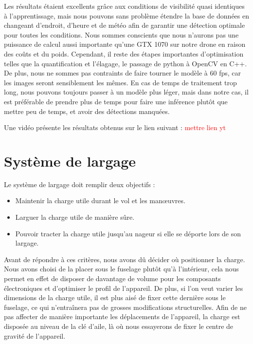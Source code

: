 \documentclass[a4paper,12pt,french]{report}
\begin{document}
Les résultats étaient excellents grâce aux conditions de visibilité quasi identiques à l'apprentissage, mais nous pouvons sans problème étendre la base de données en changeant d'endroit, d'heure et de météo afin de garantir une détection optimale pour toutes les conditions. Nous sommes conscients que nous n'aurons pas une puissance de calcul aussi importante qu'une GTX 1070 sur notre drone en raison des coûts et du poids. Cependant, il reste des étapes importantes d'optimisation telles que la quantification et l'élagage, le passage de python à OpenCV en C++. De plus, nous ne sommes pas contraints de faire tourner le modèle à 60 fps, car les images seront sensiblement les mêmes. En cas de temps de traitement trop long, nous pouvons toujours passer à un modèle plus léger, mais dans notre cas, il est préférable de prendre plus de temps pour faire une inférence plutôt que mettre peu de temps, et avoir des détections manquées.\newline

Une vidéo présente les résultats obtenus sur le lien suivant :
\textcolor{red}{mettre lien yt}

\section{Système de largage}

Le système de largage doit remplir deux objectifs :

\begin{itemize}
    \item Maintenir la charge utile durant le vol et les manœuvres.
    \item Larguer la charge utile de manière sûre.
    \item Pouvoir tracter la charge utile jusqu’au nageur si elle se déporte lors de son largage.\newline
\end{itemize}

Avant de répondre à ces critères, nous avons dû décider où positionner la charge. Nous avons choisi de la placer sous le fuselage plutôt qu’à l’intérieur, cela nous permet en effet de disposer de davantage de volume pour les composants électroniques et d’optimiser le profil de l’appareil. De plus, si l’on veut varier les dimensions de la charge utile, il est plus aisé de fixer cette dernière sous le fuselage, ce qui n'entraînera pas de grosses modifications structurelles. Afin de ne pas affecter de manière importante les déplacements de l’appareil, la charge est disposée au niveau de la clé d’aile, là où nous essayerons de fixer le centre de gravité de l’appareil.\newline
\end{document}
